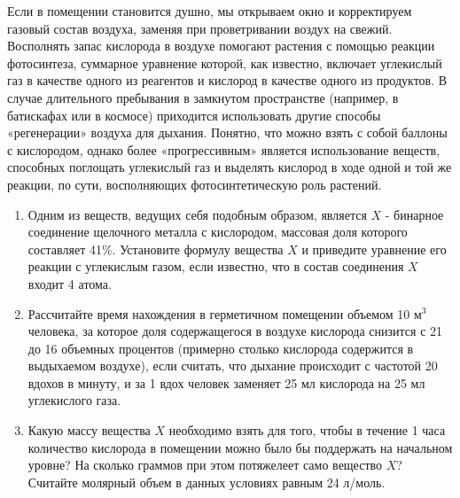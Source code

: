 
Если в помещении становится душно, мы открываем окно и корректируем газовый состав воздуха, заменяя при 
проветривании воздух на свежий. Восполнять запас кислорода в воздухе помогают растения с помощью реакции 
фотосинтеза, суммарное уравнение которой, как известно, включает углекислый газ в качестве одного из реагентов 
и кислород в качестве одного из продуктов. В случае длительного пребывания в замкнутом пространстве (например, в батискафах или в космосе) приходится использовать другие способы «регенерации» воздуха для 
дыхания. Понятно, что можно взять с собой баллоны с кислородом, однако более «прогрессивным» является 
использование веществ, способных поглощать углекислый газ и выделять кислород в ходе одной и той же реакции, 
по сути, восполняющих фотосинтетическую роль растений.

\begin{enumerate}
    \item Одним из веществ, ведущих себя подобным образом, является $X$ - бинарное соединение щелочного металла с кислородом, 
    массовая доля которого составляет 41\%. Установите формулу вещества $X$ и приведите уравнение его реакции с углекислым 
    газом, если известно, что в состав соединения $X$ входит 4 атома.
    \item Рассчитайте время нахождения в герметичном помещении объемом 10 м$^3$ человека, за которое доля 
    содержащегося в воздухе кислорода снизится с 21 до 16 объемных процентов (примерно столько кислорода 
    содержится в выдыхаемом воздухе), если считать, что дыхание происходит с частотой 20 вдохов в минуту, 
    и за 1 вдох человек заменяет 25 мл кислорода на 25 мл углекислого газа.
    \item Какую массу вещества $X$ необходимо взять для того, чтобы в течение 1 часа 
    количество кислорода в помещении можно было бы поддержать на начальном уровне? На 
    сколько граммов при этом потяжелеет само вещество $X$? Считайте молярный объем в данных условиях равным 24 л/моль.    
\end{enumerate}

